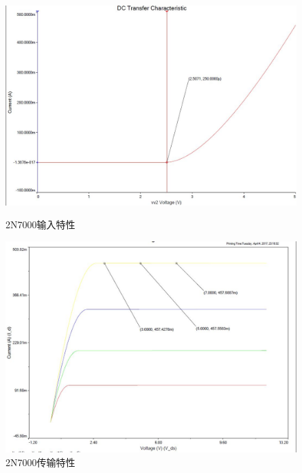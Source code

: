 \documentclass[UTF8,a4paper]{ctexart}
\begin{document}
\begin{figure}
\centering
\includegraphics[width=\textwidth]{2-1in.jpg}
\caption{2N7000输入特性}
\label{in}
\includegraphics[width=\textwidth]{2-1out.jpg}
\caption{2N7000传输特性}
\label{transfer} 
\end{figure}
\end{document}
